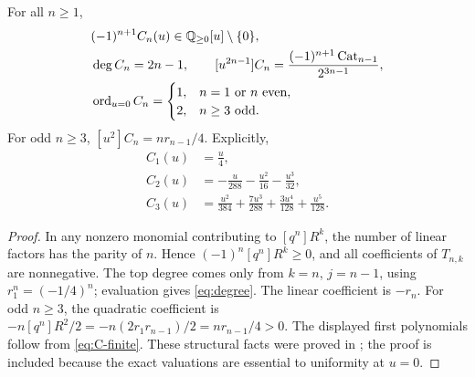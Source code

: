 \begin{proposition}
\label{prop:structure}
For all $n\ge1$,
\begin{align}
 &(-1)^{n+1}C_n(u)\in\mathbb Q_{\ge0}[u]\setminus\{0\},\label{eq:sign}\\
 &\deg C_n=2n-1,\qquad
 [u^{2n-1}]C_n=\frac{(-1)^{n+1}\operatorname{Cat}_{n-1}}{2^{3n-1}},\label{eq:degree}\\
 &\operatorname{ord}_{u=0} C_n=
 \begin{cases}1,&n=1\text{ or }n\text{ even},\\2,&n\ge3\text{ odd}.
 \end{cases}\label{eq:valuation}
\end{align}
For odd $n\ge3$, $[u^2]C_n=n r_{n-1}/4$. Explicitly,
\begin{align}
 C_1(u)&=\frac u4,\nonumber\\
 C_2(u)&=-\frac u{288}-\frac{u^2}{16}-\frac{u^3}{32},\label{eq:firstC}\\
 C_3(u)&=\frac{u^2}{384}+\frac{7u^3}{288}
              +\frac{3u^4}{128}+\frac{u^5}{128}.\nonumber
\end{align}
\end{proposition}
\begin{proof}
In any nonzero monomial contributing to $[q^n]R^k$, the number of linear
factors has the parity of $n$. Hence $(-1)^n[q^n]R^k\ge0$, and all
coefficients of $T_{n,k}$ are nonnegative. The top degree comes only from
$k=n$, $j=n-1$, using $r_1^n=(-1/4)^n$; evaluation gives
\eqref{eq:degree}. The linear coefficient is $-r_n$. For odd $n\ge3$, the
quadratic coefficient is
$-n[q^n]R^2/2=-n(2r_1r_{n-1})/2=n r_{n-1}/4>0$.
The displayed first polynomials follow from \eqref{eq:C-finite}.
These structural facts were proved in \cite{incoming}; the proof is included
because the exact valuations are essential to uniformity at $u=0$.
\end{proof}
